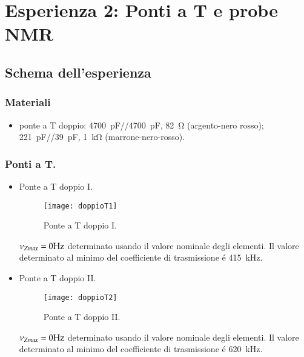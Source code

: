 \documentclass[main.tex]{subfiles}
\begin{document}

\chapter{Esperienza 2: Ponti a T e probe NMR}

\section{Schema dell'esperienza}

\subsection{Materiali}

\begin{itemize}
\item ponte a T doppio: \SI{4700}{\pico\farad}//\SI{4700}{\pico\farad}, \SI{82}{\ohm} (argento-nero rosso); \SI{221}{\pico\farad}//\SI{39}{\pico\farad}, \SI{1}{\kilo\ohm} (marrone-nero-rosso).
\end{itemize}

\subsection{Ponti a T.}

\begin{itemize}
\item Ponte a T doppio I.
\begin{figure}[!ht]\centering\texttt{[image: doppioT1]}\caption{Ponte a T doppio I.}\label{fig:T1}\end{figure}
\edef\RT{82}   %
\edef\CT{4700*(10)^(-12)}   %
$\nu_{Zmax}=\pgfmathparse{((\CT*\RT)^(-1))/(2*pi)}\pgfmathprintnumber{\pgfmathresult}\si{\hertz}$ determinato usando il valore nominale degli elementi. Il valore determinato al minimo del coefficiente di trasmissione \'e \SI{415}{\kilo\hertz}.

\item Ponte a T doppio II.
\begin{figure}[!ht]\centering\texttt{[image: doppioT2]}\caption{Ponte a T doppio II.}\label{fig:T2}\end{figure}
\edef\RT{1000}   %
\edef\CT{(39+221)*10^(-12)}   %
$\nu_{Zmax}=\pgfmathparse{((\CT*\RT)^(-1))/(2*pi)}\pgfmathprintnumber{\pgfmathresult}\si{\hertz}$ determinato usando il valore nominale degli elementi. Il valore determinato al minimo del coefficiente di trasmissione \'e \SI{620}{\kilo\hertz}.

\end{itemize}
\end{document}
